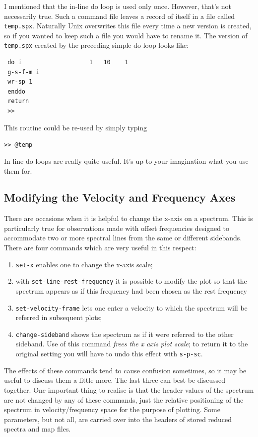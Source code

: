 \documentclass[11pt,twoside]{article}
\begin{document}
I mentioned that the in-line do loop is used only once. However,
that's not necessarily true. Such a command file leaves a record of
itself in a file called {\tt temp.spx}. Naturally Unix overwrites this
file every time a new version is created, so if you wanted to keep
such a file you would have to rename it. The version of {\tt temp.spx}
created by the preceding simple do loop looks like:

\begin{verbatim}
 do i                   1   10    1
 g-s-f-m i
 wr-sp 1
 enddo
 return
 >> 
\end{verbatim}
This routine could be re-used by simply typing

\verb|>> @temp|

In-line do-loops are really quite useful. It's up to your imagination
what you use them for.


\subsection{Modifying the Velocity and Frequency Axes}
\label{sec:modifying-axes}
There are occasions when it is helpful to change the x-axis on a
spectrum. This is particularly true for observations made with offset
frequencies designed to accommodate two or more spectral lines from
the same or different sidebands. There are four commands which are
very useful in this respect: 
\begin{enumerate}
\item
\verb|set-x| enables one to change the x-axis scale;
\item
with \verb|set-line-rest-frequency| it is possible to modify the plot
so that the spectrum appears as if this frequency had been chosen as
the rest frequency 
\item
\verb|set-velocity-frame| lets one enter a velocity to which the
spectrum will be referred in subsequent plots; 
\item
\verb|change-sideband| shows the spectrum as if it were referred to
the other sideband. Use of this command {\it frees the x axis plot
scale}; to return it to the original setting you will have to undo
this effect with {\tt s-p-sc}.
\end{enumerate}
The effects of these commands tend to cause confusion sometimes, so it
may be useful to discuss them a little more. The last three can best
be discussed together.  One important thing to realise is that the
header values of the spectrum are not changed by any of these
commands, just the relative positioning of the spectrum in
velocity/frequency space for the purpose of plotting. Some parameters,
but not all, are carried over into the headers of stored reduced 
spectra and map files.
\end{document}
